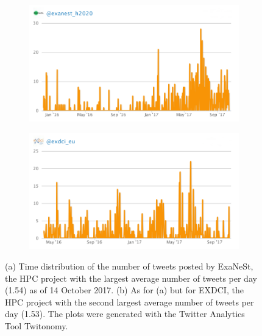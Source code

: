 \begin{figure}
 \centering
 \begin{subfigure}[t]{0.95\textwidth}
   \includegraphics[width=1\linewidth]{Images/Tweets_Exanest.png}
   \caption{} 
 \end{subfigure}

\begin{subfigure}[t]{0.95\textwidth}
   \includegraphics[width=1\linewidth]{Images/Tweets_Exdci.png}
   \caption{}
 \end{subfigure}
 \caption{(a) Time distribution of the number of tweets posted by ExaNeSt, the HPC project with the largest average number of tweets per day (1.54) as of 14 October 2017. (b) As for (a) but for EXDCI, the HPC project with the second largest average number of tweets per day (1.53). The plots were generated with the Twitter Analytics Tool Twitonomy.} 
 \label{Tweets_Exanest-Exdci}
\end{figure}

